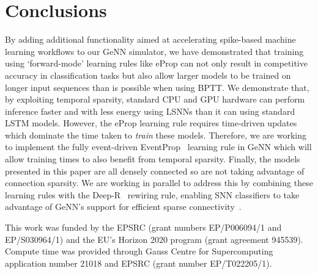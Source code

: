 \documentclass[sigconf,authordraft]{acmart}
\begin{document}
\section{Conclusions}
By adding additional functionality aimed at accelerating spike-based machine learning workflows to our GeNN simulator, we have demonstrated that training using `forward-mode' learning rules like eProp can not only result in competitive accuracy in classification tasks but also allow  larger models to be trained on longer input sequences than is possible when using BPTT.
We demonstrate that, by exploiting temporal sparsity, standard CPU and GPU hardware can perform inference faster and with less energy using LSNNs than it can using standard LSTM models.
However, the eProp learning rule requires time-driven updates which dominate the time taken to \emph{train} these models.
Therefore, we are working to implement the fully event-driven EventProp~\citep{Wunderlich2021} learning rule in GeNN which will allow training times to also benefit from temporal sparsity.
Finally, the models presented in this paper are all densely connected so are not taking advantage of connection sparsity.
We are working in parallel to address this by combining these learning rules with the Deep-R~\citep{Bellec2018a} rewiring rule, enabling SNN classifiers to take advantage of GeNN's support for efficient sparse connectivity~\citep{Knight2018}.


\begin{acks}
This work was funded by the EPSRC (grant numbers EP/P006094/1 and EP/S030964/1) and the EU's Horizon 2020 program (grant agreement 945539).
Compute time was provided through Gauss Centre for Supercomputing application number 21018 and EPSRC (grant number EP/T022205/1).
\end{acks}



\end{document}

